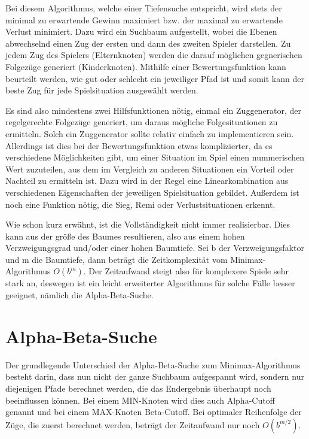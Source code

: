 \documentclass[
	12pt,
	halfparskip,
	a4paper,
	abstract,
	bibliography=totoc,
	liststotoc
]{scrreprt}
\begin{document}
Bei diesem Algorithmus, welche einer Tiefensuche entspricht, wird stets der minimal zu erwartende Gewinn maximiert bzw. der maximal zu erwartende Verlust minimiert. Dazu wird ein Suchbaum aufgestellt, wobei die Ebenen abwechselnd einen Zug der ersten und dann des zweiten Spieler darstellen. Zu jedem Zug des Spielers (Elternknoten) werden die darauf möglichen gegnerischen Folgezüge generiert (Kinderknoten). Mithilfe einer Bewertungsfunktion kann beurteilt werden, wie gut oder schlecht ein jeweiliger Pfad ist und somit kann der beste Zug für jede Spielsituation ausgewählt werden. \citep{vl}

Es sind also mindestens zwei Hilfsfunktionen nötig, einmal ein Zuggenerator, der regelgerechte Folgezüge generiert, um daraus mögliche Folgesituationen zu ermitteln. Solch ein Zuggenerator sollte relativ einfach zu implementieren sein. Allerdings ist dies bei der Bewertungsfunktion etwas komplizierter, da es verschiedene Möglichkeiten gibt, um einer Situation im Spiel einen nummerischen Wert zuzuteilen, aus dem im Vergleich zu anderen Situationen ein Vorteil oder Nachteil zu ermitteln ist. Dazu wird in der Regel eine Linearkombination aus verschiedenen Eigenschaften der jeweiligen Spielsituation gebildet. Außerdem ist noch eine Funktion nötig, die Sieg, Remi oder Verlustsituationen erkennt. \citep[S. 162f]{ai}

Wie schon kurz erwähnt, ist die Vollständigkeit nicht immer realisierbar. Dies kann aus der größe des Baumes resultieren, also aus einem hohen Verzweigungsgrad und/oder einer hohen Baumtiefe. Sei b der Verzweigungsfaktor und m die Baumtiefe, dann beträgt die Zeitkomplexität vom Minimax-Algorithmus $O(b^m)$. Der Zeitaufwand steigt also für komplexere Spiele sehr stark an, deswegen ist ein leicht erweiterter Algorithmus für solche Fälle besser geeignet, nämlich die Alpha-Beta-Suche. \citep{vl, minimax}

\section{Alpha-Beta-Suche}

Der grundlegende Unterschied der Alpha-Beta-Suche zum Minimax-Algorithmus besteht darin, dass nun nicht der ganze Suchbaum aufgespannt wird, sondern nur diejenigen Pfade berechnet werden, die das Endergebnis überhaupt noch beeinflussen können. Bei einem MIN-Knoten wird dies auch Alpha-Cutoff genannt und bei einem MAX-Knoten Beta-Cutoff. Bei optimaler Reihenfolge der Züge, die zuerst berechnet werden, beträgt der Zeitaufwand nur noch $O(b^{m/2})$. \citep{vl}
\end{document}
